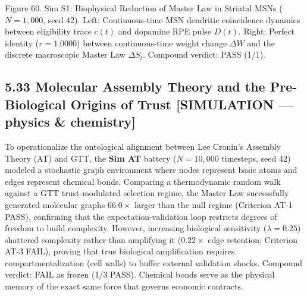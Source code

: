 \documentclass[
]{article}
\begin{document}
Figure 60. Sim S1: Biophysical Reduction of Master Law in Striatal MSNs
(\(N = 1,000\), seed 42). Left: Continuous-time MSN dendritic
coincidence dynamics between eligibility trace \(c(t)\) and dopamine RPE
pulse \(D(t)\). Right: Perfect identity (\(r = 1.0000\)) between
continuous-time weight change \(\Delta W\) and the discrete macroscopic
Master Law \(\Delta S_t\). Compound verdict: PASS (1/1).

\subsection{5.33 Molecular Assembly Theory and the Pre-Biological
Origins of Trust {[}SIMULATION --- physics \&
chemistry{]}}\label{molecular-assembly-theory-and-the-pre-biological-origins-of-trust-simulation-physics-chemistry}

To operationalize the ontological alignment between Lee Cronin's
Assembly Theory (AT) and GTT, the \textbf{Sim AT} battery
(\(N = 10,000\) timesteps, seed 42) modeled a stochastic graph
environment where nodes represent basic atoms and edges represent
chemical bonds. Comparing a thermodynamic random walk against a GTT
trust-modulated selection regime, the Master Law successfully generated
molecular graphs \(66.0\times\) larger than the null regime (Criterion
AT-1 PASS), confirming that the expectation-validation loop restricts
degrees of freedom to build complexity. However, increasing biological
sensitivity (\(\lambda = 0.25\)) shattered complexity rather than
amplifying it (\(0.22\times\) edge retention; Criterion AT-3 FAIL),
proving that true biological amplification requires compartmentalization
(cell walls) to buffer external validation shocks. Compound verdict:
FAIL as frozen (1/3 PASS). Chemical bonds serve as the physical memory
of the exact same force that governs economic contracts.
\end{document}
